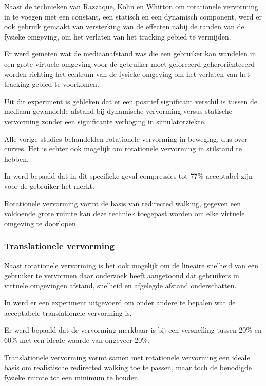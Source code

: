 \documentclass[a4paper,12pt]{article}
\begin{document}
Naast de technieken van Razzaque, Kohn en Whitton\cite{kohn01} om rotationele
vervorming in te voegen met een constant, een statisch en een dynamisch component,
werd er ook gebruik gemaakt van versterking van de effecten nabij de randen van
de fysieke omgeving, om het verlaten van het tracking gebied te vermijden.

Er werd gemeten wat de mediaanafstand was die een gebruiker kan wandelen in een
grote virtuele omgeving voor de gebruiker moet geforceerd geherori\"enteeerd
worden richting het centrum van de fysieke omgeving om het verlaten van het
tracking gebied te voorkomen.

Uit dit experiment is gebleken dat er een positief significant verschil is tussen
de mediaan gewandelde afstand bij dynamische vervorming versus statische
vervorming zonder een significante verhoging in simulatorziekte.

Alle vorige studies behandelden rotationele vervorming in beweging, dus over 
curves. Het is echter ook mogelijk om rotationele vervorming in stilstand te
hebben.

In\cite{steinicke09} werd bepaald dat in dit specifieke geval compressies tot
77\% acceptabel zijn voor de gebruiker het merkt.

Rotationele vervorming vormt de basis van redirected walking, gegeven een
voldoende grote ruimte kan deze techniek toegepast worden om elke virtuele
omgeving te doorlopen.


\subsubsection{Translationele vervorming}
Naast rotationele vervorming is het ook mogelijk om de lineaire snelheid van een
gebruiker te vervormen daar onderzoek heeft aangetoond dat gebruikers in virtuele
omgevingen afstand\cite{loomis03}, snelheid\cite{banton05} en afgelegde afstand
\cite{frenz07} onderschatten.

In\cite{steinicke09} werd er een experiment uitgevoerd om onder andere te bepalen
wat de acceptabele translationele vervorming is.

Er werd bepaald dat de vervorming merkbaar is bij een versnelling tussen 20\% en
60\% met een ideale waarde van ongeveer 20\%.

Translationele vervorming vormt samen met rotationele vervorming een ideale basis 
om realistische redirected walking toe te passen, maar toch de benodigde fysieke 
ruimte tot een minimum te houden.
\end{document}
